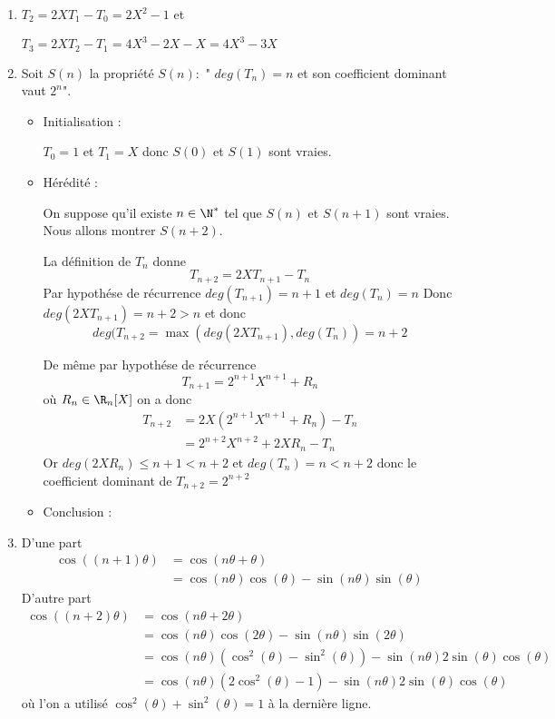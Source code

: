 \documentclass[a4paper, 11pt,reqno]{article}
\begin{document}
\begin{correction}
\begin{enumerate}
\item $T_2 = 2XT_1 -T_0 = 2X^2-1$ et 

$T_3=2XT_2-T_1= 4X^3-2X-X= 4X^3-3X$

\item 
Soit $S(n) $ la propriété $S(n) :$ "  $deg(T_n)=n$ et son coefficient dominant vaut $2^n$".

\begin{itemize}
\item Initialisation : 

$T_0=1$ et $T_1=X$ donc
$S(0) $ et $S(1)$ sont vraies.

\item Hérédité :

On suppose qu'il existe $n\in \N^*$ tel que $S(n) $ et $S(n+1)$ sont vraies. 
Nous allons montrer $S(n+2)$.

La définition de $T_n$ donne 
$$T_{n+2} =2XT_{n+1} -T_n$$
Par hypothése de récurrence $deg(T_{n+1} )=n+1$ et $deg(T_n)=n$ 
Donc $deg(2XT_{n+1})= n+2>n$ et donc 
$$deg(T_{n+2} =\max  (deg(2XT_{n+1}), deg(T_n) ) =n+2$$

De même par hypothése de récurrence 
$$T_{n+1} = 2^{n+1} X^{n+1} +R_n$$ où $R_n\in \R_{n}[X]$ on a donc 
\begin{align*}
T_{n+2} &= 2X (2^{n+1} X^{n+1} +R_n) -T_n\\
			&=2^{n+2} X^{n+2} +2XR_n -T_n
\end{align*}
Or $deg(2XR_n) \leq n+1<n+2$ et $deg(T_n)=n <n+2$
donc le coefficient dominant de $T_{n+2} =2^{n+2}$

\item Conclusion  :

\end{itemize}


\item 
D'une part 
\begin{align*}
\cos((n+1)\theta)& =\cos(n\theta +\theta)\\
&= \cos(n\theta)\cos(\theta) -\sin(n\theta) \sin(\theta)
\end{align*}
D'autre part 
\begin{align*}
\cos((n+2)\theta)& =\cos(n\theta +2\theta)\\
&= \cos(n\theta)\cos(2\theta) -\sin(n\theta) \sin(2\theta)\\
&= \cos(n\theta)(\cos^2(\theta) -\sin^2(\theta))-\sin(n\theta)2 \sin(\theta)\cos(\theta)\\
&= \cos(n\theta)(2\cos^2(\theta) -1)-\sin(n\theta)2 \sin(\theta)\cos(\theta)
\end{align*}
où l'on a utilisé $\cos^2(\theta) +\sin^2(\theta)=1$ à la dernière ligne. 


\end{enumerate}
\end{correction}
\end{document}
